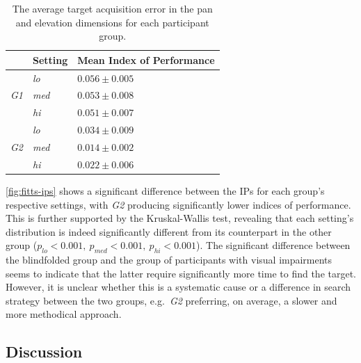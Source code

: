 \documentclass[acmsmall]{acmart}
\begin{document}
\begin{table}
  \centering
  \caption{The average target acquisition error in the pan and elevation dimensions for each participant group. }\label{tab:fitts-results}
  \begin{tabular}{p{0.5cm}p{1.5cm}p{2.5cm}}
    \toprule
    & Setting      & Mean Index of Performance \\ \midrule
    & \textit{lo}  & $0.056\pm0.005$ \\
    \textit{G1} & \textit{med} & $0.053\pm0.008$ \\
		& \textit{hi}  & $0.051\pm0.007$ \\ \cline{2-3}
    & \textit{lo}  & $0.034\pm0.009$ \\
    \textit{G2} & \textit{med} & $0.014\pm0.002$ \\
    & \textit{hi}  & $0.022\pm0.006$ \\
    \bottomrule
  \end{tabular}
\end{table}

\cref{fig:fitts-ips} shows a significant difference between the IPs for each group's respective settings, with \textit{G2} producing significantly lower indices of performance.
This is further supported by the Kruskal-Wallis test, revealing that each setting's distribution is indeed significantly different from its counterpart in the other group ($p_{lo} < 0.001,~p_{med} < 0.001,~p_{hi} < 0.001$).
The significant difference between the blindfolded group and the group of participants with visual impairments seems to indicate that the latter require significantly more time to find the target. 
However, it is unclear whether this is a systematic cause or a difference in search strategy between the two groups, e.g.\ \textit{G2} preferring, on average, a slower and more methodical approach.

\subsection{Discussion}
\end{document}
